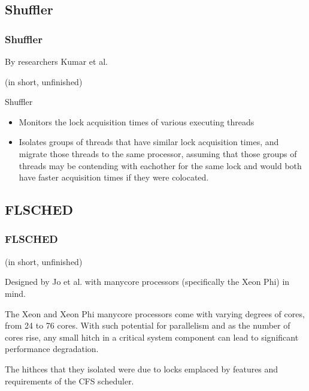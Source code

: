 \documentclass{beamer}
\newcommand{\linespace}{\vskip 0.25cm}
\begin{document}
\subsection{Shuffler}
\begin{frame}
\frametitle{Shuffler}

By researchers Kumar et al.

\linespace


\end{frame}
\begin{frame}

(in short, unfinished)

Shuffler
\begin{itemize}

\item Monitors the lock acquisition times of various executing threads
\item Isolates groups of threads that have similar lock acquisition times, and migrate those threads to the same processor, assuming that those groups of threads may be contending with eachother for the same lock and would both have faster acquisition times if they were colocated.
\end{itemize}

\end{frame}

\subsection{FLSCHED}
\begin{frame}
\frametitle{FLSCHED}

(in short, unfinished)

Designed by Jo et al. with manycore processors (specifically the Xeon Phi) in mind.

\linespace

The Xeon and Xeon Phi manycore processors come with varying degrees of cores, from 24 to 76 cores. With such potential for parallelism and as the number of cores rise, any small hitch in a critical system component can lead to significant performance degradation. 

The hithces that they isolated were due to locks emplaced by features and requirements of the CFS scheduler.

\end{frame}
\end{document}
